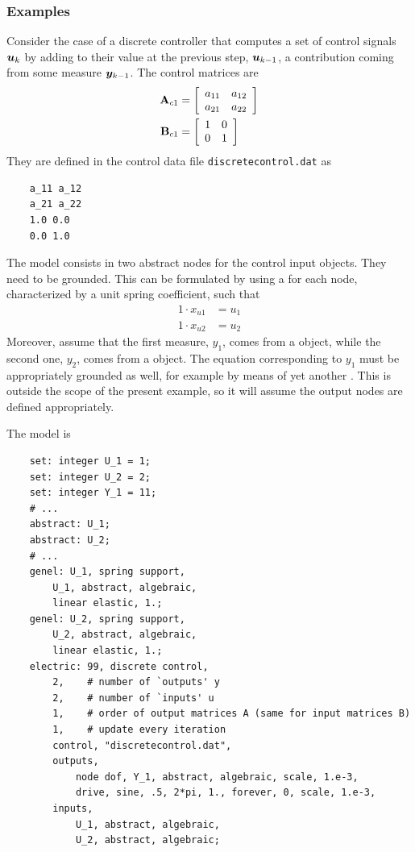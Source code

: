 \subsubsection{Examples}
Consider the case of a discrete controller that computes
a set of control signals $\T{u}_k$ by adding to their value
at the previous step, $\T{u}_{k-1}$, a contribution coming
from some measure $\T{y}_{k-1}$.
The control matrices are
\begin{subequations}
\begin{align}
	\TT{A}_{c1}
	&=
	\sqbr{\matr{cc}{
		a_{11} & a_{12} \\
		a_{21} & a_{22}
	}}
	\\
	\TT{B}_{c1}
	&=
	\sqbr{\matr{cc}{
		1 & 0 \\
		0 & 1
	}}
\end{align}
\end{subequations}
They are defined in the control data file \texttt{discretecontrol.dat} as
\begin{verbatim}
    a_11 a_12
    a_21 a_22
    1.0 0.0
    0.0 1.0
\end{verbatim}
The model consists in two abstract nodes for the control input
 objects.
They need to be grounded.
This can be formulated by using a  
for each  node, characterized by a unit spring coefficient,
such that
\begin{subequations}
\begin{align}
	1 \cdot x_{u1} &= u_1
	\\
	1 \cdot x_{u2} &= u_2
\end{align}
\end{subequations}
Moreover, assume that the first measure, $y_1$,
comes from a  object,
while the second one, $y_2$, comes from a  object.
The equation corresponding to $y_1$ must be appropriately grounded
as well, for example by means of yet another 
.
This is outside the scope of the present example, so it will assume
the output nodes are defined appropriately.

The model is
\begin{verbatim}
    set: integer U_1 = 1;
    set: integer U_2 = 2;
    set: integer Y_1 = 11;
    # ...
    abstract: U_1;
    abstract: U_2;
    # ...
    genel: U_1, spring support,
        U_1, abstract, algebraic,
        linear elastic, 1.;
    genel: U_2, spring support,
        U_2, abstract, algebraic,
        linear elastic, 1.;
    electric: 99, discrete control,
        2,    # number of `outputs' y
        2,    # number of `inputs' u
        1,    # order of output matrices A (same for input matrices B)
        1,    # update every iteration
        control, "discretecontrol.dat",
        outputs,
            node dof, Y_1, abstract, algebraic, scale, 1.e-3,
            drive, sine, .5, 2*pi, 1., forever, 0, scale, 1.e-3,
        inputs,
            U_1, abstract, algebraic,
            U_2, abstract, algebraic;
\end{verbatim}




